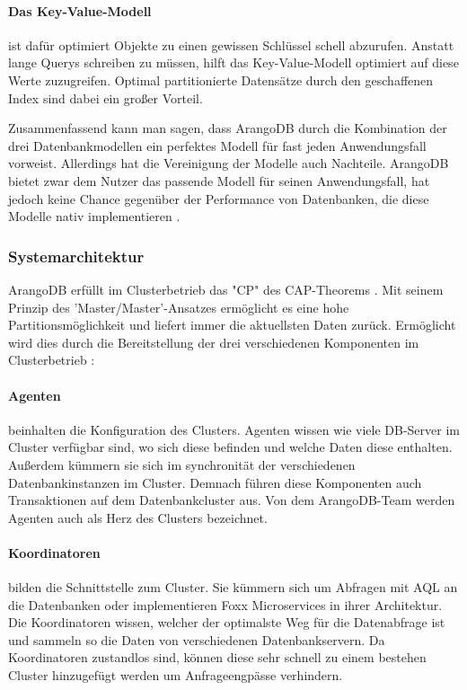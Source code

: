 \paragraph{Das Key-Value-Modell} ist dafür optimiert Objekte zu einen gewissen Schlüssel schell abzurufen.  Anstatt lange Querys schreiben zu müssen, hilft das Key-Value-Modell optimiert auf diese Werte zuzugreifen. Optimal partitionierte Datensätze durch den geschaffenen Index sind dabei ein großer Vorteil. \cite{AWS_keyvalue}

Zusammenfassend kann man sagen, dass ArangoDB durch die Kombination der drei Datenbankmodellen ein perfektes Modell für fast jeden Anwendungsfall vorweist. Allerdings hat die Vereinigung der Modelle auch Nachteile. ArangoDB bietet zwar dem Nutzer das passende Modell für seinen Anwendungsfall, hat jedoch keine Chance gegenüber der Performance von Datenbanken, die diese Modelle nativ implementieren \cite{ADB_benchmark}.

\subsubsection{Systemarchitektur}
ArangoDB erfüllt im Clusterbetrieb das "CP" des CAP-Theorems \cite{CAP}. Mit seinem Prinzip des 'Master/Master'-Ansatzes ermöglicht es eine hohe Partitionsmöglichkeit und liefert immer die aktuellsten Daten zurück. Ermöglicht wird dies durch die Bereitstellung der drei verschiedenen Komponenten im Clusterbetrieb \cite{ADB_clusterarch}:
\paragraph{Agenten} 
beinhalten die Konfiguration des Clusters. Agenten wissen wie viele DB-Server im Cluster verfügbar sind, wo sich diese befinden und welche Daten diese enthalten. Außerdem kümmern sie sich im synchronität der verschiedenen Datenbankinstanzen im Cluster. Demnach führen diese Komponenten auch Transaktionen auf dem Datenbankcluster aus. Von dem ArangoDB-Team werden Agenten auch als Herz des Clusters bezeichnet. \cite{ADB_clusterarch}
\paragraph{Koordinatoren} bilden die Schnittstelle zum Cluster. Sie kümmern sich um Abfragen mit \ac{AQL} an die Datenbanken oder implementieren Foxx Microservices in ihrer Architektur. Die Koordinatoren wissen, welcher der optimalste Weg für die Datenabfrage ist und sammeln so die Daten von verschiedenen Datenbankservern. Da Koordinatoren zustandlos sind, können diese sehr schnell zu einem bestehen Cluster hinzugefügt werden um Anfrageengpässe verhindern. \cite{ADB_clusterarch}
